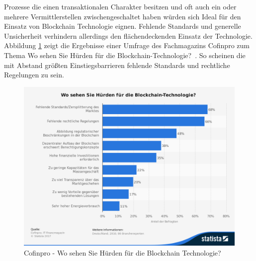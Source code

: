 Prozesse die einen transaktionalen Charakter besitzen und oft auch ein oder mehrere Vermittlerstellen zwischengeschaltet haben würden sich Ideal für den Einsatz von Blockchain Technologie eignen. Fehlende Standards und generelle Unsicherheit verhindern allerdings den flächendeckenden Einsatz der Technologie.\\

Abbildung \ref{fig:statista-huerden-blockchain-2016} zeigt die Ergebnisse einer Umfrage des Fachmagazins Cofinpro zum Thema \glqq Wo sehen Sie Hürden für die Blockchain-Technologie?\grqq~. So scheinen die mit Abstand größten Einstiegsbarrieren fehlende Standards und rechtliche Regelungen zu sein.

\begin{figure}[h!]
	\centering
	\includegraphics[width=0.7\linewidth]{pictures/Statista-Huerden-Blockchain-2016}
	\caption[Statista Blockchain Umfrage]{Cofinpro - Wo sehen Sie Hürden für die Blockchain Technologie? \cite{Cofinpro}}
	\label{fig:statista-huerden-blockchain-2016}
\end{figure}


\newpage
